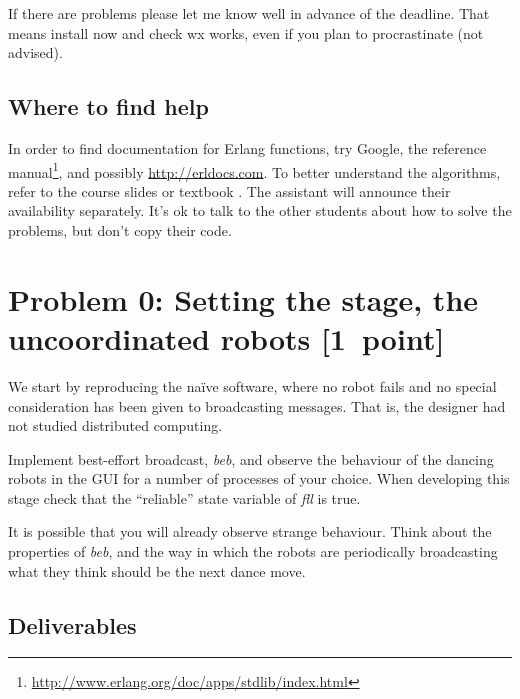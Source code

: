 \documentclass[a4paper]{article}
\begin{document}
If there are problems please let me know well in advance of the deadline.
That means install now and check wx works, even if you plan to procrastinate
(not advised).



\subsection*{Where to find help} %
\label{sub:where_to_find_help}

In order to find documentation for Erlang functions, try Google, the reference
manual\footnote{\url{http://www.erlang.org/doc/apps/stdlib/index.html}}, and
possibly \url{http://erldocs.com}.
To better understand the algorithms, refer to the course slides or textbook
\cite{cachin2011}.
The assistant will announce their availability separately.
It's ok to talk to the other students about how to solve the problems, but
don't copy their code.







\section*{Problem 0: Setting the stage, the uncoordinated robots [1~point]} %
\label{sec:p0}

We start by reproducing the naïve software, where no robot fails and no
special consideration has been given to broadcasting messages. That is, the
designer had not studied distributed computing.

Implement best-effort broadcast, \emph{beb}, and observe the behaviour of the
dancing robots in the GUI for a number of processes of your choice.
When developing this stage check that the ``reliable'' state variable of
\emph{fll} is true.

It is possible that you will already observe strange behaviour. Think about
the properties of \emph{beb}, and the way in which the robots are periodically
broadcasting what they think should be the next dance move.

\subsection*{Deliverables} %
\label{sub:p0_deliverables}
\end{document}
